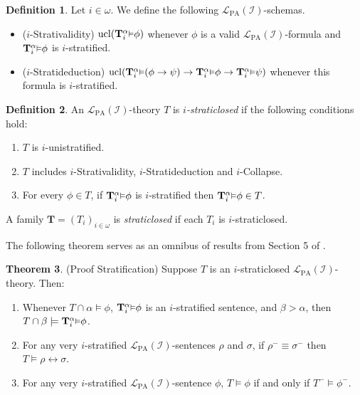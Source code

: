 \documentclass[reqno]{article}
\theoremstyle{definition}
\newtheorem{theorem}{Theorem}
\newtheorem{definition}[theorem]{Definition}
\def\L{\mathscr{L}}
\def\T{\mathbf{T}}
\def\LPA{\L_{\mathrm{PA}}}
\def\indset{\mathcal I}
\newcommand{\Prr}[2]{\T^{#1}_{#2}\mbox{\small${\vDash}$}}
\newcommand{\ucl}[1]{\mathrm{ucl}(#1)}
\begin{document}
\begin{definition}
\label{stratschemasdefn}
Let $i\in\omega$.
We define the following $\LPA(\indset)$-schemas.
\begin{itemize}
\item ($i$-Strativalidity) $\ucl{\Prr\alpha i\phi}$ whenever $\phi$ is a valid $\LPA(\indset)$-formula
and $\Prr\alpha i\phi$ is $i$-stratified.
\item ($i$-Stratideduction) $\ucl{\Prr\alpha i(\phi\rightarrow\psi)\rightarrow\Prr\alpha i\phi\rightarrow \Prr\alpha i\psi}$
whenever this formula is $i$-stratified.
\end{itemize}
\end{definition}

\begin{definition}
\label{straticloseddefn}
An $\LPA(\indset)$-theory $T$ is \emph{$i$-straticlosed} if
the following conditions hold:
\begin{enumerate}
\item $T$ is $i$-unistratified.
\item $T$ includes $i$-Strativalidity, $i$-Stratideduction and $i$-Collapse.
\item For every $\phi\in T$, if $\Prr\alpha i\phi$ is $i$-stratified then
$\Prr\alpha i\phi\in T$.
\end{enumerate}
A family $\T=(T_i)_{i\in\omega}$ is \emph{straticlosed} if each $T_i$ is
$i$-straticlosed.
\end{definition}

The following theorem serves as an omnibus of results from Section 5 of \cite{carlson2000}.

\begin{theorem}
\label{proofstratification}
(Proof Stratification)
Suppose $T$ is an $i$-straticlosed $\LPA(\indset)$-theory.
Then:
\begin{enumerate}
\item Whenever $T\cap\alpha\models\phi$,
$\Prr\alpha i\phi$ is an $i$-stratified sentence,
and $\beta>\alpha$, then $T\cap\beta\models\Prr\alpha i\phi$.
\item For any very $i$-stratified $\LPA(\indset)$-sentences $\rho$ and 
$\sigma$, if $\rho^-\equiv\sigma^-$
then $T\models \rho\leftrightarrow\sigma$.
\item
For any very $i$-stratified $\LPA(\indset)$-sentence $\phi$,
$T\models\phi$ if and only if $T^-\models\phi^-$.
\end{enumerate}
\end{theorem}
\end{document}
